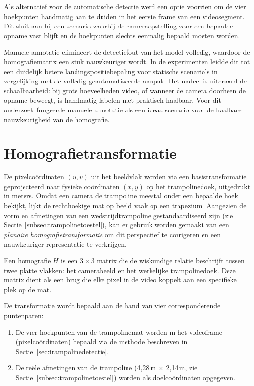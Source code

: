 Als alternatief voor de automatische detectie werd een optie voorzien om de vier hoekpunten handmatig aan te duiden in het eerste frame van een videosegment. Dit sluit aan bij een scenario waarbij de cameraopstelling voor een bepaalde opname vast blijft en de hoekpunten slechts eenmalig bepaald moeten worden.

Manuele annotatie elimineert de detectiefout van het model volledig, waardoor de homografiematrix een stuk nauwkeuriger wordt. In de experimenten leidde dit tot een duidelijk betere landingspositiebepaling voor statische scenario's in vergelijking met de volledig geautomatiseerde aanpak. Het nadeel is uiteraard de schaalbaarheid: bij grote hoeveelheden video, of wanneer de camera doorheen de opname beweegt, is handmatig labelen niet praktisch haalbaar. Voor dit onderzoek fungeerde manuele annotatie als een ideaalscenario voor de haalbare nauwkeurigheid van de homografie.

\section{Homografietransformatie}
\label{sec:homografie}

De pixelco{\"o}rdinaten $(u, v)$ uit het beeldvlak worden via een basistransformatie geprojecteerd naar fysieke co{\"o}rdinaten $(x, y)$ op het trampolinedoek, uitgedrukt in meters. Omdat een camera de trampoline meestal onder een bepaalde hoek bekijkt, lijkt de rechthoekige mat op beeld vaak op een trapezium. Aangezien de vorm en afmetingen van een wedstrijdtrampoline gestandaardiseerd zijn (zie Sectie~\ref{subsec:trampolinetoestel}), kan er gebruik worden gemaakt van een \textit{planaire homografietransformatie} om dit perspectief te corrigeren en een nauwkeuriger representatie te verkrijgen.

Een homografie $H$ is een $3 \times 3$ matrix die de wiskundige relatie beschrijft tussen twee platte vlakken: het camerabeeld en het werkelijke trampolinedoek. Deze matrix dient als een brug die elke pixel in de video koppelt aan een specifieke plek op de mat.


De transformatie wordt bepaald aan de hand van vier corresponderende puntenparen:
\begin{enumerate}
    \item De vier hoekpunten van de trampolinemat worden in het videoframe (pixelco{\"o}rdinaten) bepaald via de methode beschreven in Sectie~\ref{sec:trampolinedetectie}.
    \item De re{\"e}le afmetingen van de trampoline (4,28\,m $\times$ 2,14\,m, zie Sectie~\ref{subsec:trampolinetoestel}) worden als doelco{\"o}rdinaten opgegeven.
\end{enumerate}

